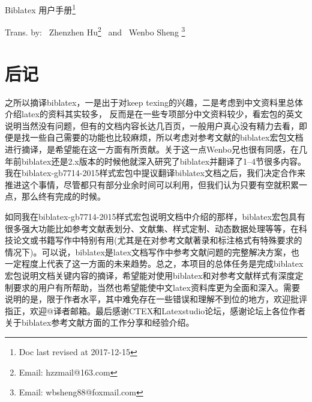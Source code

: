 \documentclass{ltxdockit}[2011/03/25]
\begin{document}
\printtitlepage

\begin{trivlist}\item\relax
{\hfill\heiti{}Biblatex 用户手册\footnote{Doc last revised at 2017-12-15}\hfill\hspace*{1pt}}\par
{\hfill\fangsong{}Trans. by:~ Zhenzhen Hu\footnote{Email: hzzmail@163.com} ~and~ %
    	Wenbo Sheng \footnote{Email: wbsheng88@foxmail.com}\hfill\hspace*{2.5cm}}\par
{\hfill\kaiti{}\hfill\hspace*{0.5cm}}\par
\end{trivlist}
\renewcommand{\contentsname}{目录}
\renewcommand{\listtablename}{表格}
\tableofcontents
\listoftables











\printglossary[type=trans,style=longragged3colborder,nopostdot=true,nogroupskip]%

\section{后记}

\setlength{\parskip}{2mm}\setlength{\itemindent}{2em}

之所以摘译biblatex，一是出于对keep texing的兴趣，二是考虑到中文资料里总体介绍latex的资料其实较多，
反而是在一些专项部分中文资料较少，看宏包的英文说明当然没有问题，但有的文档内容长达几百页，一般用户真心没有精力去看，即便是找一些自己需要的功能也比较麻烦，所以考虑对参考文献的biblatex宏包文档进行摘译，是希望能在这一方面有所贡献。关于这一点Wenbo兄也很有同感，在几年前biblatex还是2.x版本的时候他就深入研究了biblatex并翻译了1--4节很多内容。我在biblatex-gb7714-2015样式宏包中提议翻译biblatex文档之后，我们决定合作来推进这个事情，尽管都只有部分业余时间可以利用，但我们认为只要有空就积累一点，那么终有完成的时候。

如同我在biblatex-gb7714-2015样式宏包说明文档中介绍的那样，biblatex宏包具有很多强大功能比如参考文献表划分、文献集、样式定制、动态数据处理等等，在科技论文或书籍写作中特别有用(尤其是在对参考文献著录和标注格式有特殊要求的情况下)。可以说，biblatex是latex文档写作中参考文献问题的完整解决方案，也一定程度上代表了这一方面的未来趋势。总之，本项目的总体任务是完成biblatex宏包说明文档关键内容的摘译，希望能对使用biblatex和对参考文献样式有深度定制要求的用户有所帮助，当然也希望能使中文latex资料库更为全面和深入。需要说明的是，限于作者水平，其中难免存在一些错误和理解不到位的地方，欢迎批评指正，欢迎@译者邮箱。最后感谢CTEX和Latexstudio论坛，感谢论坛上各位作者关于biblatex参考文献方面的工作分享和经验介绍。
\end{document}
